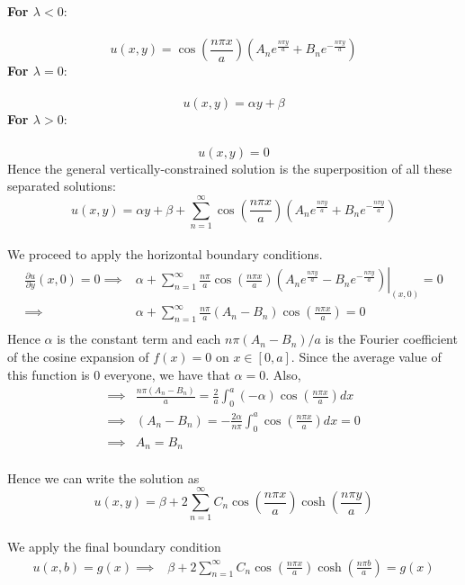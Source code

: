 \documentclass[12pt]{article}
\begin{document}
{\textbf{For $\lambda < 0$}: \\ \\
$$u(x,y) = \cos \left( \frac{n \pi x}{a} \right) \left( A_n e^{ \frac{n\pi y}{a} } + B_n e^{-\frac{n\pi y}{a}}  \right)$$
\textbf{For $\lambda = 0$}: \\ \\
$$u(x,y) = \alpha y + \beta$$
\textbf{For $\lambda > 0$}: \\ \\
$$u(x,y) = 0$$
Hence the general vertically-constrained solution is the superposition of all these separated solutions: \\
$$u(x,y) = \alpha y + \beta + \sum_{n=1}^{\infty} \cos \left( \frac{n \pi x}{a} \right) \left( A_n e^{ \frac{n\pi y}{a} } + B_n e^{-\frac{n\pi y}{a}}  \right)$$ \\
We proceed to apply the horizontal boundary conditions. \\
\begin{align*}
\frac{\partial u}{\partial y}(x,0) = 0 \implies&  \left. \alpha + \sum_{n=1}^{\infty} \frac{n\pi}{a} \cos \left( \frac{n \pi x}{a} \right) \left( A_n e^{ \frac{n\pi y}{a} } - B_n e^{-\frac{n\pi y}{a}} \right) \right|_{(x,0)} = 0 \\
\implies& \alpha + \sum_{n=1}^{\infty} \frac{n\pi}{a} (A_n - B_n) \cos \left( \frac{n \pi x}{a} \right) = 0  \\
\end{align*}
Hence $\alpha$ is the constant term and each $n \pi (A_n - B_n)  / a$ is the Fourier coefficient of the cosine expansion of $f(x) = 0$ on $x\in[0,a]$. Since the average value of this function is $0$ everyone, we have that $\boxed{\alpha = 0}$. Also, \\
\begin{align*}
\implies& \frac{n\pi (A_n - B_n) }{a} = \frac{2}{a} \int_0^a (-\alpha) \cos \left( \frac{n\pi x}{a} \right) dx \\
\implies& (A_n - B_n)  = -\frac{2\alpha}{n\pi} \int_0^a \cos \left( \frac{n\pi x}{a} \right) dx = 0 \\
\implies & \boxed{A_n = B_n}
\end{align*} \\
Hence we can write the solution as
$$u(x,y) =  \beta + 2 \sum_{n=1}^{\infty} C_n \cos \left( \frac{n \pi x}{a} \right) \cosh \left( \frac{n \pi y}{a} \right)$$ \\
We apply the final boundary condition
\begin{align*}
u(x,b) = g(x) \implies& \beta + 2 \sum_{n=1}^{\infty} C_n \cos \left( \frac{n \pi x}{a} \right) \cosh \left( \frac{n \pi b}{a} \right) = g(x) \\

\end{align*}}
\end{document}
